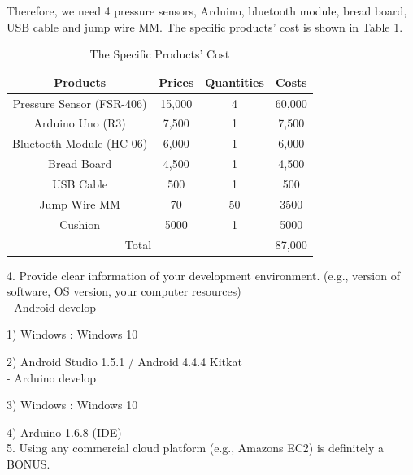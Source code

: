 \documentclass[conference]{IEEEtran}
\begin{document}
Therefore, we need 4 pressure sensors, Arduino, bluetooth module, bread board, USB cable and jump wire MM. The specific products' cost is shown in Table 1.\\
\begin{center}

\begin{table}[H]
\caption{The Specific Products' Cost }
\begin{tabular}{|c|c|c|c|}\hline


Products & Prices & Quantities & Costs \\ \hline \hline

Pressure Sensor (FSR-406) & 15,000 & 4 & 60,000  \\ \hline 

Arduino Uno (R3) & 7,500 & 1 & 7,500 \\ \hline

Bluetooth Module (HC-06) & 6,000 & 1  & 6,000 \\ \hline

Bread Board & 4,500 & 1 & 4,500 \\\hline

USB Cable & 500 & 1 & 500  \\ \hline

Jump Wire MM& 70 & 50 & 3500  \\ \hline

Cushion & 5000 & 1 & 5000 \\ \hline

\multicolumn{3}{|c|}{Total} & \multicolumn{1}{|l|}{87,000} \\ \hline 

\end{tabular}
\end{table}
\end{center}

4.	Provide clear information of your development environment. (e.g., version of software, OS version, your computer resources)\\

-	Android develop

1)	Windows : Windows 10

2)	Android Studio 1.5.1 / Android 4.4.4 Kitkat\\

-	Arduino develop 

3)	Windows : Windows 10

4)	Arduino 1.6.8 (IDE)\\


5.	Using any commercial cloud platform (e.g., Amazons EC2) is definitely a BONUS.\\
\end{document}
